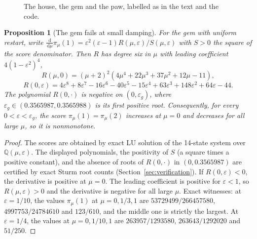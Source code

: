 \documentclass[11pt,a4paper]{article}
\newtheorem{proposition}[theorem]{Proposition}
\theoremstyle{definition}\newtheorem{conjecture}{Conjecture}
\theoremstyle{remark}\newtheorem{remark}[theorem]{Remark}
\newcommand{\eps}{\varepsilon}
\newcommand{\dd}{\,\mathrm{d}}
\begin{document}
\begin{figure}[htbp]
\centering
{}
\caption{The house, the gem and the paw, labelled as in the text and the code.}\label{fig:small}
\end{figure}

\begin{proposition}[The gem fails at small damping]\label{prop:gem}
For the gem with uniform restart, write $\frac{\dd}{\dd\mu}\pi_\mu(1)=\eps^2(\eps-1)R(\mu,\eps)/S(\mu,\eps)$ with $S>0$ the square of the score denominator. Then $R$ has degree six in $\mu$ with leading coefficient $4(1-\eps^2)^4$,
\[
 R(\mu,0)=(\mu+2)^2(4\mu^4+22\mu^3+37\mu^2+12\mu-11),
\]
\[
 R(0,\eps)=4\eps^8+8\eps^7-16\eps^6-40\eps^5-15\eps^4+63\eps^3+148\eps^2+64\eps-44 .
\]
The polynomial $R(0,\cdot)$ is negative on $(0,\eps_g)$, where $\eps_g\in(0.3565987,0.3565988)$ is its first positive root. Consequently, for every $0<\eps<\eps_g$, the score $\pi_\mu(1)=\pi_\mu(2)$ increases at $\mu=0$ and decreases for all large $\mu$, so it is nonmonotone.
\end{proposition}
\begin{proof}
The scores are obtained by exact LU solution of the 14-state system over $\mathbb Q(\mu,\eps)$. The displayed polynomials, the positivity of $S$ (a square times a positive constant), and the absence of roots of $R(0,\cdot)$ in $(0,0.3565987)$ are certified by exact Sturm root counts (Section~\ref{sec:verification}). If $R(0,\eps)<0$, the derivative is positive at $\mu=0$. The leading coefficient is positive for $\eps<1$, so $R(\mu,\eps)>0$ and the derivative is negative for all large $\mu$. Exact witnesses: at $\eps=1/10$, the values $\pi_\mu(1)$ at $\mu=0,1/3,1$ are $53729499/266457580$, $4997753/24784610$ and $123/610$, and the middle one is strictly the largest. At $\eps=1/4$, the values at $\mu=0,1/10,1$ are $263957/1293580$, $263643/1292020$ and $51/250$.
\end{proof}
\end{document}
